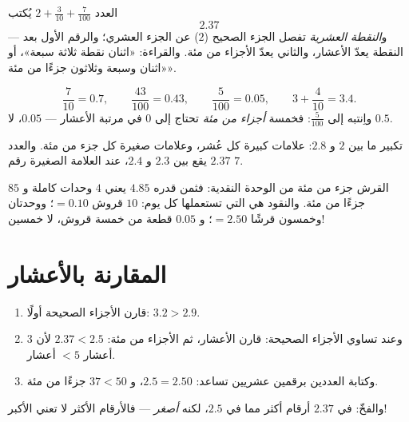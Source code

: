 \begin{definition}\label{def:g4:decimals:point}
العدد $2 + \frac{3}{10} + \frac{7}{100}$ يُكتب
\[
2.37
\]
--- و\emph{النقطة العشرية} تفصل الجزء الصحيح ($2$) عن
الجزء العشري؛ والرقم الأول بعد النقطة يعدّ الأعشار،
والثاني يعدّ الأجزاء من مئة. والقراءة: «اثنان نقطة ثلاثة
سبعة»، أو «اثنان وسبعة وثلاثون جزءًا من مئة».
\end{definition}

\begin{example}\label{ex:g4:decimals:convert}
\[
\frac{7}{10} = 0.7, \qquad
\frac{43}{100} = 0.43, \qquad
\frac{5}{100} = 0.05, \qquad
3 + \frac{4}{10} = 3.4 .
\]
واِنتبه إلى $\frac{5}{100}$: فخمسة \emph{أجزاء من مئة} تحتاج إلى
$0$ في مرتبة الأعشار --- $0.05$، لا $0.5$.
\end{example}

\begin{omfigure}

{\small تكبير ما بين $2$ و $2.8$: علامات كبيرة كل عُشر، وعلامات
صغيرة كل جزء من مئة. والعدد $2.37$ يقع بين $2.3$ و
$2.4$، عند العلامة الصغيرة رقم $7$.}
\end{omfigure}

\begin{example}\label{ex:g4:decimals:money}
القرش جزء من مئة من الوحدة النقدية: فثمن قدره
$4.85$ يعني $4$ وحدات كاملة و $85$ جزءًا من مئة. والنقود هي
 التي تستعملها كل يوم: $10$ قروش $= 0.10$؛
ووحدتان وخمسون قرشًا $= 2.50$؛ و $0.05$ قطعة من خمسة قروش، لا خمسين!
\end{example}

\section{المقارنة بالأعشار}

\begin{method}\label{met:g4:decimals:compare}
\begin{enumerate}
  \item قارن الأجزاء الصحيحة أولًا: $3.2 > 2.9$.
  \item وعند تساوي الأجزاء الصحيحة: قارن الأعشار، ثم الأجزاء
        من مئة: $2.37 < 2.5$ لأن $3$ أعشار $< 5$ أعشار.
  \item وكتابة العددين برقمين عشريين تساعد: $2.5 = 2.50$، و
        $37 < 50$ جزءًا من مئة.
\end{enumerate}
والفخّ: في $2.37$ أرقام أكثر مما في $2.5$، لكنه
\emph{أصغر} --- فالأرقام الأكثر لا تعني الأكبر!
\end{method}

